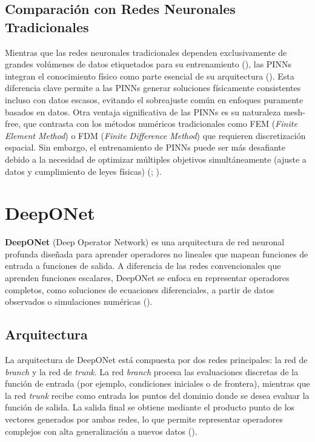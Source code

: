 \documentclass[
  spanish,
  us-letterpaper,
]{scrreprt}
\theoremstyle{plain}
\theoremstyle{definition}
\theoremstyle{remark}
\begin{document}
\section{Comparación con Redes Neuronales
Tradicionales}\label{comparaciuxf3n-con-redes-neuronales-tradicionales}

Mientras que las redes neuronales tradicionales dependen exclusivamente
de grandes volúmenes de datos etiquetados para su entrenamiento
(), las PINNs
integran el conocimiento físico como parte esencial de su arquitectura
(). Esta diferencia
clave permite a las PINNs generar soluciones físicamente consistentes
incluso con datos escasos, evitando el sobreajuste común en enfoques
puramente basados en datos. Otra ventaja significativa de las PINNs es
su naturaleza mesh-free, que contrasta con los métodos numéricos
tradicionales como FEM (\emph{Finite Element Method}) o FDM
(\emph{Finite Difference Method}) que requieren discretización espacial.
Sin embargo, el entrenamiento de PINNs puede ser más desafiante debido a
la necesidad de optimizar múltiples objetivos simultáneamente (ajuste a
datos y cumplimiento de leyes físicas)
(;
).

\chapter{DeepONet}\label{deeponet}

\textbf{DeepONet} (Deep Operator Network) es una arquitectura de red
neuronal profunda diseñada para aprender operadores no lineales que
mapean funciones de entrada a funciones de salida. A diferencia de las
redes convencionales que aprenden funciones escalares, DeepONet se
enfoca en representar operadores completos, como soluciones de
ecuaciones diferenciales, a partir de datos observados o simulaciones
numéricas ().

\section{Arquitectura}\label{arquitectura}

La arquitectura de DeepONet está compuesta por dos redes principales: la
red de \emph{branch} y la red de \emph{trunk}. La red \emph{branch}
procesa las evaluaciones discretas de la función de entrada (por
ejemplo, condiciones iniciales o de frontera), mientras que la red
\emph{trunk} recibe como entrada los puntos del dominio donde se desea
evaluar la función de salida. La salida final se obtiene mediante el
producto punto de los vectores generados por ambas redes, lo que permite
representar operadores complejos con alta generalización a nuevos datos
().
\end{document}
